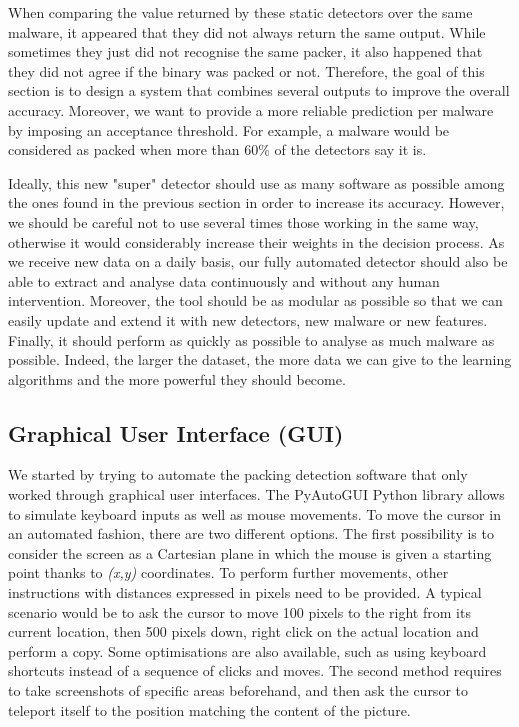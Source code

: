 When comparing the value returned by these static detectors over the same malware, it appeared that they did not always return the same output. While sometimes they just did not recognise the same packer, it also happened that they did not agree if the binary was packed or not. Therefore, the goal of this section is to design a system that combines several outputs to improve the overall accuracy. Moreover, we want to provide a more reliable prediction per malware by imposing an acceptance threshold. For example, a malware would be considered as packed when more than 60\% of the detectors say it is. 

Ideally, this new "super" detector should use as many software as possible among the ones found in the previous section in order to increase its accuracy. However, we should be careful not to use several times those working in the same way, otherwise it would considerably increase their weights in the decision process. As we receive new data on a daily basis, our fully automated detector should also be able to extract and analyse data continuously and without any human intervention. Moreover, the tool should be as modular as possible so that we can easily update and extend it with new detectors, new malware or new features. Finally, it should perform as quickly as possible to analyse as much malware as possible. Indeed, the larger the dataset, the more data we can give to the learning algorithms and the more powerful they should become.

\subsection{Graphical User Interface (GUI)}

We started by trying to automate the packing detection software that only worked through graphical user interfaces. The PyAutoGUI Python library \cite{pyautogui} allows to simulate keyboard inputs as well as mouse movements. To move the cursor in an automated fashion, there are two different options. The first possibility is to consider the screen as a Cartesian plane in which the mouse is given a starting point thanks to \textit{(x,y)} coordinates. To perform further movements, other instructions with distances expressed in pixels need to be provided. A typical scenario would be to ask the cursor to move 100 pixels to the right from its current location, then 500 pixels down, right click on the actual location and perform a copy. Some optimisations are also available, such as using keyboard shortcuts instead of a sequence of clicks and moves. The second method requires to take screenshots of specific areas beforehand, and then ask the cursor to teleport itself to the position matching the content of the picture.

